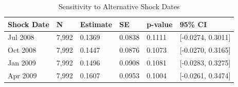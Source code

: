 \begin{table}[ht]
\centering
\begin{tabular}{llllll}
  \toprule
Shock Date & N & Estimate & SE & p-value & 95\% CI \\ 
  \midrule
Jul 2008 & 7,992 & 0.1369 & 0.0838 & 0.1111 & [-0.0274, 0.3011] \\ 
  Oct 2008 & 7,992 & 0.1447 & 0.0876 & 0.1073 & [-0.0270, 0.3165] \\ 
  Jan 2009 & 7,992 & 0.1496 & 0.0908 & 0.1081 & [-0.0283, 0.3275] \\ 
  Apr 2009 & 7,992 & 0.1607 & 0.0953 & 0.1004 & [-0.0261, 0.3474] \\ 
   \bottomrule
\end{tabular}
\caption{Sensitivity to Alternative Shock Dates} 
\label{tab:alt_shocks}
\end{table}
